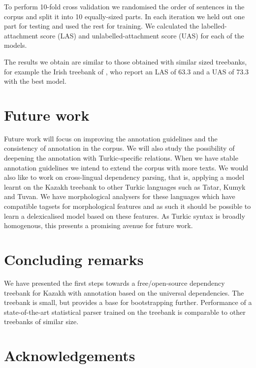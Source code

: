 \documentclass[a4paper,11pt, onecolumn,twoside]{article}
\begin{document}
To perform 10-fold cross validation we randomised the order of sentences in the corpus
and split it into 10 equally-sized parts. In each iteration we held out one part for testing and used
the rest for training. We calculated the labelled-attachment score (LAS) and 
unlabelled-attachment score (UAS) for each of the models.

The results we obtain are similar to those obtained with similar 
sized treebanks, for example the Irish treebank of \textcite{Lynn12}, who report an LAS of
63.3 and a UAS of 73.3 with the best model.


\section{Future work}\label{sec:future}




Future work will focus on improving the annotation guidelines and the consistency of
annotation in the corpus. We will also study the possibility of deepening the annotation
with Turkic-specific relations. When we have stable annotation guidelines we intend to 
extend the corpus with more texts.
We would also like to work on cross-lingual dependency parsing,
that is, applying a model learnt on the Kazakh treebank to other Turkic languages
such as Tatar, Kumyk and Tuvan. We have morphological analysers for these languages which have
compatible tagsets for morphological features and as such it should be possible to learn a
delexicalised model based on these features. As Turkic syntax is broadly homogenous, this
presents a promising avenue for future work.


\section{Concluding remarks}\label{sec:conclusions}

We have presented the first steps towards a free/open-source dependency treebank for
Kazakh with annotation based on the universal dependencies. The treebank is small, but
provides a base for bootstrapping further. Performance of a state-of-the-art statistical
parser trained on the treebank is comparable to other treebanks of similar size.

\section*{Acknowledgements}


%
%
\begin{small}
\printbibliography
\end{small}
\end{document}
